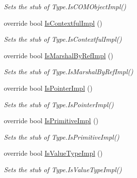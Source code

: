 \begin{DoxyCompactItemize}
\begin{DoxyCompactList}\small\item\em Sets the stub of Type.\-Is\-C\-O\-M\-Object\-Impl()\end{DoxyCompactList}\item 
override bool \hyperlink{class_system_1_1_fakes_1_1_stub_type_a3c689e70198089af7abbb1d476d97589}{Is\-Contextful\-Impl} ()
\begin{DoxyCompactList}\small\item\em Sets the stub of Type.\-Is\-Contextful\-Impl()\end{DoxyCompactList}\item 
override bool \hyperlink{class_system_1_1_fakes_1_1_stub_type_aa6e63626b485bbfb539659f3e8be25d5}{Is\-Marshal\-By\-Ref\-Impl} ()
\begin{DoxyCompactList}\small\item\em Sets the stub of Type.\-Is\-Marshal\-By\-Ref\-Impl()\end{DoxyCompactList}\item 
override bool \hyperlink{class_system_1_1_fakes_1_1_stub_type_a33479c338ebdfb573a6f988eef7074ff}{Is\-Pointer\-Impl} ()
\begin{DoxyCompactList}\small\item\em Sets the stub of Type.\-Is\-Pointer\-Impl()\end{DoxyCompactList}\item 
override bool \hyperlink{class_system_1_1_fakes_1_1_stub_type_a68ab0dc3ead040d60086ffafb878718c}{Is\-Primitive\-Impl} ()
\begin{DoxyCompactList}\small\item\em Sets the stub of Type.\-Is\-Primitive\-Impl()\end{DoxyCompactList}\item 
override bool \hyperlink{class_system_1_1_fakes_1_1_stub_type_a00e9a04f9a43d0214b638c7555de1703}{Is\-Value\-Type\-Impl} ()
\begin{DoxyCompactList}\small\item\em Sets the stub of Type.\-Is\-Value\-Type\-Impl()\end{DoxyCompactList}\end{DoxyCompactItemize}
